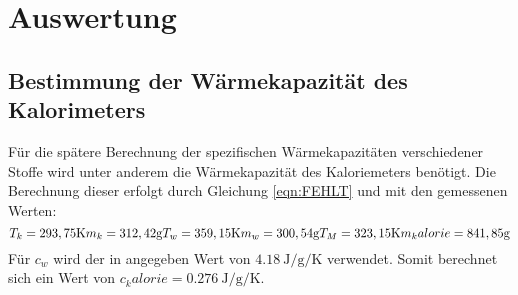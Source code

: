 \section{Auswertung}
\label{sec:Auswertung}

\subsection{Bestimmung der Wärmekapazität des Kalorimeters}
\label{sec:Kalorie}
Für die spätere Berechnung der spezifischen Wärmekapazitäten verschiedener Stoffe wird unter anderem die Wärmekapazität des Kaloriemeters benötigt.
Die Berechnung dieser erfolgt durch Gleichung \ref{eqn:FEHLT} und mit den gemessenen Werten:
\begin{equation}
 T_k = 293,75 \text{K}\\
 m_k = 312,42 \text{g}\\
 T_w = 359,15 \text{K}\\
 m_w = 300,54 \text{g}\\
 T_M = 323,15 \text{K}\\
 m_kalorie = 841,85 \text{g}
\end{equation}
Für $c_w$ wird der in \cite{V201} angegeben Wert von $\SI{4,18}{\joule\per\gram\per\kelvin}$ verwendet.
Somit berechnet sich ein Wert von $ c_kalorie = \SI{0,276}{\joule\per\gram\per\kelvin}.$

